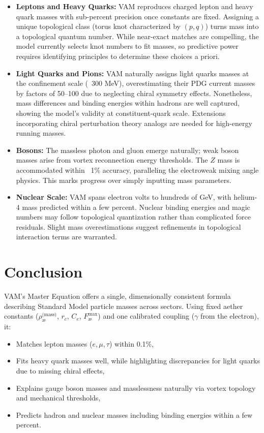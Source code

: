 \begin{itemize}
    \item \textbf{Leptons and Heavy Quarks:} VAM reproduces charged lepton and heavy quark masses with sub-percent precision once constants are fixed. Assigning a unique topological class (torus knot characterized by $(p,q)$) turns mass into a topological quantum number. While near-exact matches are compelling, the model currently selects knot numbers to fit masses, so predictive power requires identifying principles to determine these choices a priori.

    \item \textbf{Light Quarks and Pions:} VAM naturally assigns light quarks masses at the confinement scale (~300 MeV), overestimating their PDG current masses by factors of 50–100 due to neglecting chiral symmetry effects. Nonetheless, mass differences and binding energies within hadrons are well captured, showing the model’s validity at constituent-quark scale. Extensions incorporating chiral perturbation theory analogs are needed for high-energy running masses.

    \item \textbf{Bosons:} The massless photon and gluon emerge naturally; weak boson masses arise from vortex reconnection energy thresholds. The $Z$ mass is accommodated within ~1\% accuracy, paralleling the electroweak mixing angle physics. This marks progress over simply inputting mass parameters.

    \item \textbf{Nuclear Scale:} VAM spans electron volts to hundreds of GeV, with helium-4 mass predicted within a few percent. Nuclear binding energies and magic numbers may follow topological quantization rather than complicated force residuals. Slight mass overestimations suggest refinements in topological interaction terms are warranted.
\end{itemize}

\section{Conclusion}

VAM’s Master Equation offers a single, dimensionally consistent formula describing Standard Model particle masses across sectors. Using fixed aether constants ($\rho_{\text{\ae}}^{\text{(mass)}}$, $r_c$, $C_e$, $F^{\max}_{\text{\ae}}$) and one calibrated coupling ($\gamma$ from the electron), it:

\begin{itemize}
    \item Matches lepton masses ($e, \mu, \tau$) within 0.1\%,
    \item Fits heavy quark masses well, while highlighting discrepancies for light quarks due to missing chiral effects,
    \item Explains gauge boson masses and masslessness naturally via vortex topology and mechanical thresholds,
    \item Predicts hadron and nuclear masses including binding energies within a few percent.
\end{itemize}


